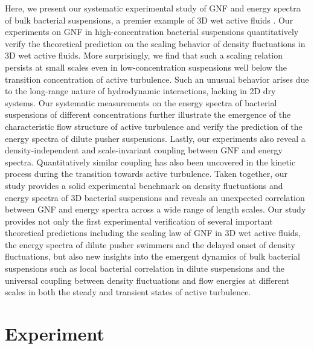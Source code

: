 \documentclass[twocolumn,aps,prx,amsmath,amssymb,longbibliography,superscriptaddress]{revtex4-2}
\begin{document}
Here, we present our systematic experimental study of GNF and energy spectra of bulk bacterial suspensions, a premier example of 3D wet active fluids \cite{Marchetti2013}. Our experiments on GNF in high-concentration bacterial suspensions quantitatively verify the theoretical prediction on the scaling behavior of density fluctuations in 3D wet active fluids. More surprisingly, we find that such a scaling relation persists at small scales even in low-concentration suspensions well below the transition concentration of active turbulence. Such an unusual behavior arises due to the long-range nature of hydrodynamic interactions, lacking in 2D dry systems. Our systematic measurements on the energy spectra of bacterial suspensions of different concentrations further illustrate the emergence of the characteristic flow structure of active turbulence and verify the prediction of the energy spectra of dilute pusher suspensions. Lastly, our experiments also reveal a density-independent and scale-invariant coupling between GNF and energy spectra. Quantitatively similar coupling has also been uncovered in the kinetic process during the transition towards active turbulence. Taken together, our study provides a solid experimental benchmark on density fluctuations and energy spectra of 3D bacterial suspensions and reveals an unexpected correlation between GNF and energy spectra across a wide range of length scales. Our study provides not only the first experimental verification of several important theoretical predictions including the scaling law of GNF in 3D wet active fluids, the energy spectra of dilute pusher swimmers and the delayed onset of density fluctuations, but also new insights into the emergent dynamics of bulk bacterial suspensions such as local bacterial correlation in dilute suspensions and the universal coupling between density fluctuations and flow energies at different scales in both the steady and transient states of active turbulence.

\section{Experiment}
\end{document}
